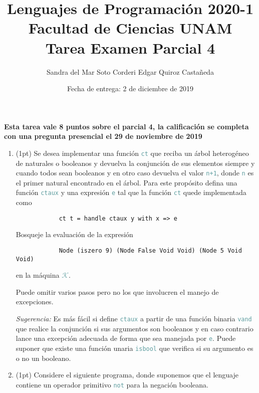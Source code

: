 \documentclass{article}
\title {
    \color{RoyalPurple}
    Lenguajes de Programación 2020-1\\
    Facultad de Ciencias UNAM\\
    Tarea Examen Parcial 4
}
\author{
    Sandra del Mar Soto Corderi \quad Edgar Quiroz Castañeda
}
\date{
    Fecha de entrega: 2 de diciembre de 2019
}
\newcommand{\tx}[1]{\textcolor{CadetBlue} {\texttt{#1}}}
\newcommand{\tb}[1]{\textcolor{RoyalPurple} {\textbf{#1}}}
\newcommand{\ti}[1]{\textcolor{RoyalPurple} {\textit{#1}}}
\newcommand{\pt}[1]{\textcolor{RoyalPurple}{(#1pt)}}
\begin{document}
    \maketitle

    \tb{Esta tarea vale 8 puntos sobre el parcial 4, la calificación se 
    completa con una pregunta presencial el 29 de noviembre de 2019}

    \begin{enumerate}
        \item \pt{1} Se desea implementar una función \tx{ct} que reciba un 
        árbol heterogéneo de naturales o booleanos y devuelva la conjunción de 
        sus elementos siempre y cuando todos sean booleanos y en otro caso 
        devuelva el valor \tx{n+1}, donde \tx{n} es el primer natural encontrado en el
        árbol. Para este propósito defina una función \tx{ctaux} y una expresión
        \tx{e} tal que la función \tx{ct} quede implementada como
        
        \begin{verbatim}
            ct t = handle ctaux y with x => e
        \end{verbatim}

        Bosqueje la evaluación de la expresión

        \begin{verbatim}
            Node (iszero 9) (Node False Void Void) (Node 5 Void Void)
        \end{verbatim}

        en la máquina \tx{$\mathcal{K}$}.

        Puede omitir varios pasos pero no los que involucren el manejo de 
        excepciones.

        \ti{Sugerencia:} Es más fácil si define \tx{ctaux} a partir de una
        función binaria \tx{vand} que realice la conjunción si sus argumentos
        son booleanos y en caso contrario lance una excepción adecuada de forma
        que sea manejada por \tx{e}. Puede suponer que existe una función unaria 
        \tx{isbool} que verifica si su argumento es o no un booleano.

        \item \pt{1} Considere el siguiente programa, donde suponemos que el 
        lenguaje contiene un operador primitivo \tx{not} para la negación 
        booleana.


\end{enumerate}
\end{document}
